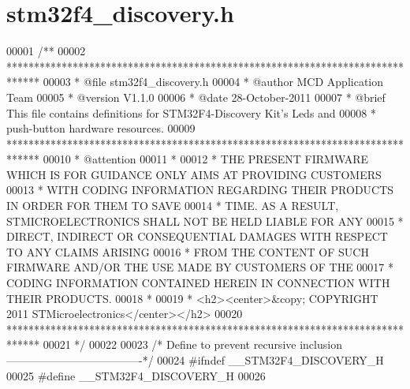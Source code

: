 \section{stm32f4\+\_\+discovery.\+h}
\label{stm32f4__discovery_8h_source}

\begin{DoxyCode}
00001 \textcolor{comment}{/**}
00002 \textcolor{comment}{  ******************************************************************************}
00003 \textcolor{comment}{  * @file    stm32f4\_discovery.h}
00004 \textcolor{comment}{  * @author  MCD Application Team}
00005 \textcolor{comment}{  * @version V1.1.0}
00006 \textcolor{comment}{  * @date    28-October-2011}
00007 \textcolor{comment}{  * @brief   This file contains definitions for STM32F4-Discovery Kit's Leds and }
00008 \textcolor{comment}{  *          push-button hardware resources.}
00009 \textcolor{comment}{  ******************************************************************************}
00010 \textcolor{comment}{  * @attention}
00011 \textcolor{comment}{  *}
00012 \textcolor{comment}{  * THE PRESENT FIRMWARE WHICH IS FOR GUIDANCE ONLY AIMS AT PROVIDING CUSTOMERS}
00013 \textcolor{comment}{  * WITH CODING INFORMATION REGARDING THEIR PRODUCTS IN ORDER FOR THEM TO SAVE}
00014 \textcolor{comment}{  * TIME. AS A RESULT, STMICROELECTRONICS SHALL NOT BE HELD LIABLE FOR ANY}
00015 \textcolor{comment}{  * DIRECT, INDIRECT OR CONSEQUENTIAL DAMAGES WITH RESPECT TO ANY CLAIMS ARISING}
00016 \textcolor{comment}{  * FROM THE CONTENT OF SUCH FIRMWARE AND/OR THE USE MADE BY CUSTOMERS OF THE}
00017 \textcolor{comment}{  * CODING INFORMATION CONTAINED HEREIN IN CONNECTION WITH THEIR PRODUCTS.}
00018 \textcolor{comment}{  *}
00019 \textcolor{comment}{  * <h2><center>&copy; COPYRIGHT 2011 STMicroelectronics</center></h2>}
00020 \textcolor{comment}{  ******************************************************************************  }
00021 \textcolor{comment}{  */}
00022 
00023 \textcolor{comment}{/* Define to prevent recursive inclusion -------------------------------------*/}
00024 \textcolor{preprocessor}{#}\textcolor{preprocessor}{ifndef} \textcolor{preprocessor}{\_\_STM32F4\_DISCOVERY\_H}
00025 \textcolor{preprocessor}{#}\textcolor{preprocessor}{define} \textcolor{preprocessor}{\_\_STM32F4\_DISCOVERY\_H}
00026 

\end{DoxyCode}
